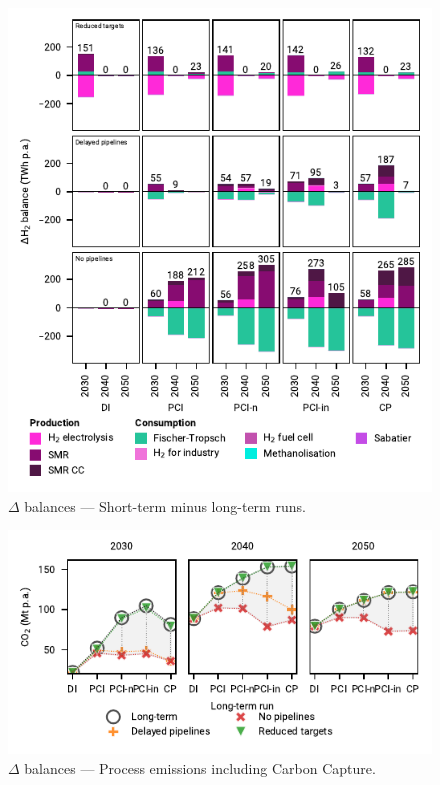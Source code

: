 \documentclass[preprint,12pt,sort&compress]{elsarticle}
\begin{document}
\begin{figure}[htbp]
  \centering
  \includegraphics[width=\linewidth]{balances_overview_extended_H2}
  \caption{$\Delta$ balances --- Short-term minus long-term runs.}
  \label{fig:balances_overview_extended_H2_stored}
\end{figure}

\begin{figure}[htbp]
  \centering
  \includegraphics[width=\linewidth]{delta_balances_process emissions CC}
  \caption{$\Delta$ balances --- Process emissions including Carbon Capture.}
  \label{fig:delta_balances_process_emissions_CC}
\end{figure}
\end{document}
